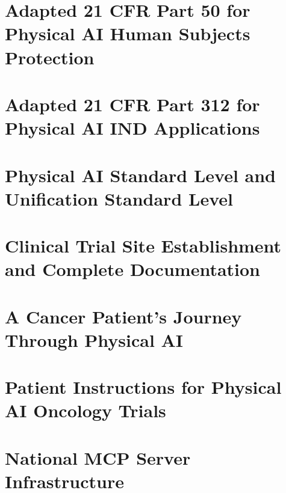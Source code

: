 \documentclass[a4paper,12pt,twoside]{article}
\begin{document}
\section{Adapted 21 CFR Part 50 for Physical AI Human Subjects Protection}
\label{sec:cfr50}

\newpage

\section{Adapted 21 CFR Part 312 for Physical AI IND Applications}
\label{sec:cfr312}

\newpage

\section{Physical AI Standard Level and Unification Standard Level}
\label{sec:psl-usl}

\newpage

\section{Clinical Trial Site Establishment and Complete Documentation}
\label{sec:site-establishment}

\newpage

\section{A Cancer Patient's Journey Through Physical AI}
\label{sec:patient-journey}

\newpage

\section{Patient Instructions for Physical AI Oncology Trials}
\label{sec:patient-instructions}

\newpage

\section{National MCP Server Infrastructure}
\label{sec:national-mcp}

\newpage
\end{document}
